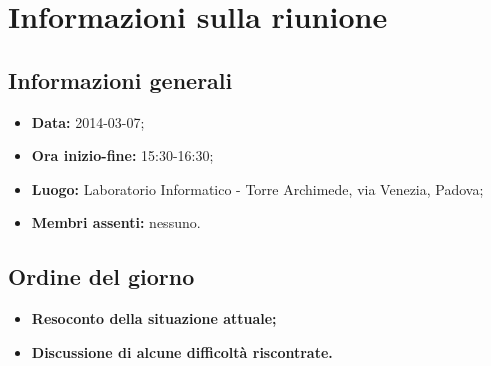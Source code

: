 \section{Informazioni sulla riunione}
\label{inforiunione}
\subsection{Informazioni generali}
\label{infogenerali}
\begin{itemize}
\item\textbf{Data:} 2014-03-07;
\item\textbf{Ora inizio-fine:} 15:30-16:30;
\item\textbf{Luogo:} Laboratorio Informatico - Torre Archimede, via Venezia, Padova;
\item\textbf{Membri assenti:} nessuno.
\end{itemize}

\subsection{Ordine del giorno}
\label{odg}
\begin{itemize}
\item\textbf{Resoconto della situazione attuale;}
\item\textbf{Discussione di alcune difficoltà riscontrate.}
\end{itemize}